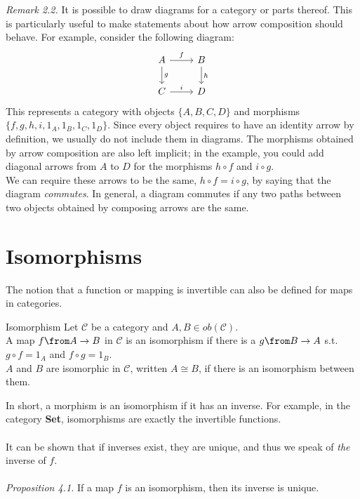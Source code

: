 \textit{Remark 2.2.}
It is possible to draw diagrams for a category or parts thereof. This is particularly useful to make statements about how arrow composition should behave. For example, consider the following diagram:
\[
  \begin{tikzcd}
    A \arrow{r}{f} \arrow{d}{g} & B \arrow{d}{h} \\
    C \arrow{r}{i}              & D 
  \end{tikzcd}
\]
This represents a category with objects $\{A, B, C, D\}$ and
morphisms $\{f, g, h, i, 1_A, 1_B, 1_C, 1_D \}$.
Since every object requires to have an identity arrow by definition,
we usually do not include them in diagrams. The morphisms obtained by arrow composition are also left implicit; in the example, you could add diagonal arrows from $A$ to $D$ for the morphisms $ h \circ f $ and $ i \circ g $. \\
We can require these arrows to be the same,  $ h \circ f = i \circ g $, by saying that the diagram \emph{commutes}. In general, a diagram commutes if any two paths between two objects
obtained by composing arrows are the same.


\section {Isomorphisms}
The notion that a function or mapping is invertible can also be defined for maps in categories.
\begin{definition}{Isomorphism}
  Let $\mathscr{C}$ be a category and $A, B \in ob(\mathscr{C})$. \\
  A map $f \from A \to B$ in $\mathscr{C}$ is an isomorphism if there is a $g \from B \to A$ s.t. $g \circ f = 1_A$ and $f \circ g = 1_B$. \\
  $A$ and $B$ are isomorphic in $\mathscr{C}$, written $A \cong B$, if there is an isomorphism between them.
\end{definition}

In short, a morphism is an isomorphism if it has an inverse.
For example, in the category \textbf{Set},
isomorphisms are exactly the invertible functions.\\\\
It can be shown that if inverses exist, they are unique, and thus we speak of
\emph{the} inverse of $f$.\\\\
\textit{Proposition 4.1.} If a map $f$ is an isomorphism, then its inverse is unique. 

